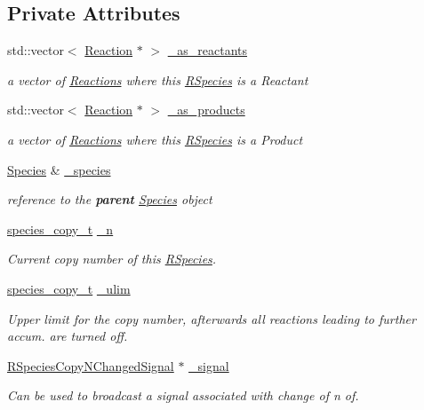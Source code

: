 \subsection*{Private Attributes}
\begin{DoxyCompactItemize}
\item 
std\-::vector$<$ \hyperlink{classchem_1_1Reaction}{Reaction} $\ast$ $>$ \hyperlink{classchem_1_1RSpecies_a3749fed57bf55e5677b4519b403598ba}{\-\_\-as\-\_\-reactants}
\begin{DoxyCompactList}\small\item\em a vector of \hyperlink{classchem_1_1Reaction}{Reactions} where this \hyperlink{classchem_1_1RSpecies}{R\-Species} is a Reactant \end{DoxyCompactList}\item 
std\-::vector$<$ \hyperlink{classchem_1_1Reaction}{Reaction} $\ast$ $>$ \hyperlink{classchem_1_1RSpecies_a680c86be9b2ef8f87525291fabb15f11}{\-\_\-as\-\_\-products}
\begin{DoxyCompactList}\small\item\em a vector of \hyperlink{classchem_1_1Reaction}{Reactions} where this \hyperlink{classchem_1_1RSpecies}{R\-Species} is a Product \end{DoxyCompactList}\item 
\hyperlink{classchem_1_1Species}{Species} \& \hyperlink{classchem_1_1RSpecies_a3a979b9226800417c7aad81a2162fac5}{\-\_\-species}
\begin{DoxyCompactList}\small\item\em reference to the {\bfseries parent} \hyperlink{classchem_1_1Species}{Species} object \end{DoxyCompactList}\item 
\hyperlink{common_8h_a3503f321fd36304ee274141275cca586}{species\-\_\-copy\-\_\-t} \hyperlink{classchem_1_1RSpecies_a60e53ebfe464923452c54322dfd479dc}{\-\_\-n}
\begin{DoxyCompactList}\small\item\em Current copy number of this \hyperlink{classchem_1_1RSpecies}{R\-Species}. \end{DoxyCompactList}\item 
\hyperlink{common_8h_a3503f321fd36304ee274141275cca586}{species\-\_\-copy\-\_\-t} \hyperlink{classchem_1_1RSpecies_a189084cfe75e004f42a6a27b2c1c09ad}{\-\_\-ulim}
\begin{DoxyCompactList}\small\item\em Upper limit for the copy number, afterwards all reactions leading to further accum. are turned off. \end{DoxyCompactList}\item 
\hyperlink{namespacechem_a09aea7e5a24368c13cd7d8d25b4d884e}{R\-Species\-Copy\-N\-Changed\-Signal} $\ast$ \hyperlink{classchem_1_1RSpecies_acd60296c77857284cd935cb6faaf4200}{\-\_\-signal}
\begin{DoxyCompactList}\small\item\em Can be used to broadcast a signal associated with change of n of. \end{DoxyCompactList}\end{DoxyCompactItemize}
